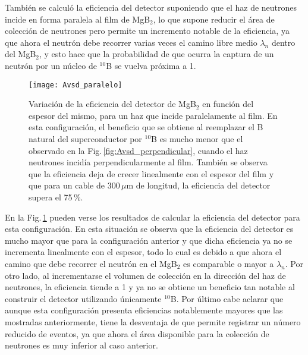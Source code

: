 También se calculó la eficiencia del detector suponiendo que el haz de neutrones incide en forma paralela al film de MgB$_2$, lo que supone reducir el área de colección de neutrones pero permite un incremento notable de la eficiencia, ya que ahora el neutrón debe recorrer varias veces el camino libre medio $\lambda_n$ dentro del MgB$_2$, y esto hace que la probabilidad de que ocurra la captura de un neutrón por un núcleo de $^{10}$B se vuelva próxima a 1.
\begin{figure}[h!]
 \vspace{-0.5cm}
  \begin{center}
    \texttt{[image: Avsd\_paralelo]}
  \end{center}
  \vspace{-1cm}
  \caption[Variación de la eficiencia del detector de MgB$_2$ en función del espesor del mismo, para un haz que incide paralelamente al film.]{Variación de la eficiencia del detector de MgB$_2$ en función del espesor del mismo, para un haz que incide paralelamente al film. En esta configuración, el beneficio que se obtiene al reemplazar el B natural del superconductor por $^{10}$B es mucho menor que el observado en la Fig.\,\ref{fig:Avsd_perpendicular}, cuando el haz neutrones incidía perpendicularmente al film. También se observa que la eficiencia deja de crecer linealmente con el espesor del film y que para un cable de 300\,$\mu$m de longitud, la eficiencia del detector supera el 75\,\%.}
\label{fig:Avsd_paralelo}
\end{figure}

En la Fig.\,\ref{fig:Avsd_paralelo} pueden verse los resultados de calcular la eficiencia del detector para esta configuración.  En esta situación se observa que la eficiencia del detector es mucho mayor que para la configuración anterior y que dicha eficiencia ya no se incrementa linealmente con el espesor, todo lo cual es debido a que ahora el camino que debe recorrer el neutrón en el MgB$_2$ es comparable o mayor a $\lambda_n$. Por otro lado, al incrementarse el volumen de colección en la dirección del haz de neutrones, la eficiencia tiende a 1 y ya no se obtiene un beneficio tan notable al construir el detector utilizando únicamente $^{10}$B. Por último cabe aclarar que aunque esta configuración presenta eficiencias notablemente mayores que las mostradas anteriormente, tiene la desventaja de que permite registrar un número reducido de eventos, ya que ahora el área disponible para la colección de neutrones es muy inferior al caso anterior.

